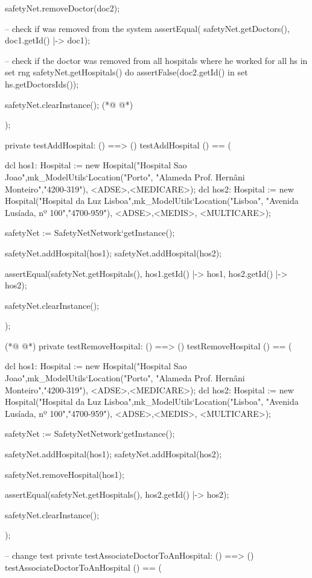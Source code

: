 \begin{vdmpp}[breaklines=true]
  safetyNet.removeDoctor(doc2);

  -- check if was removed from the system
  assertEqual( safetyNet.getDoctors(), {doc1.getId() |-> doc1});
  
  -- check if the doctor was removed from all hospitals where he worked
  for all hs in set rng safetyNet.getHospitals() do
   assertFalse(doc2.getId() in set hs.getDoctorsIds());
  
  safetyNet.clearInstance();
(*@
\label{testRemoveHospital:212}
@*)
    
);

private testAddHospital: () ==> ()
 testAddHospital () == (
  
  dcl hos1: Hospital := new Hospital("Hospital Sao Joao",mk_ModelUtils`Location("Porto", "Alameda Prof. Hernâni Monteiro","4200-319"), {<ADSE>,<MEDICARE>});
  dcl hos2: Hospital := new Hospital("Hospital da Luz Lisboa",mk_ModelUtils`Location("Lisboa", "Avenida Lusíada, nº 100","4700-959"), {<ADSE>,<MEDIS>, <MULTICARE>});
  
  safetyNet := SafetyNetNetwork`getInstance();
   
  safetyNet.addHospital(hos1);
  safetyNet.addHospital(hos2);
  
  assertEqual(safetyNet.getHospitals(), { hos1.getId() |-> hos1, hos2.getId() |-> hos2});
  
  safetyNet.clearInstance();
    
);

(*@
\label{testAssociateDoctorToAnHospital:232}
@*)
private testRemoveHospital: () ==> ()
 testRemoveHospital () == (
  
  dcl hos1: Hospital := new Hospital("Hospital Sao Joao",mk_ModelUtils`Location("Porto", "Alameda Prof. Hernâni Monteiro","4200-319"), {<ADSE>,<MEDICARE>});
  dcl hos2: Hospital := new Hospital("Hospital da Luz Lisboa",mk_ModelUtils`Location("Lisboa", "Avenida Lusíada, nº 100","4700-959"), {<ADSE>,<MEDIS>, <MULTICARE>});
  
  safetyNet := SafetyNetNetwork`getInstance();
   
  safetyNet.addHospital(hos1);
  safetyNet.addHospital(hos2);

  safetyNet.removeHospital(hos1);

  assertEqual(safetyNet.getHospitals(), { hos2.getId() |-> hos2});
  
  safetyNet.clearInstance();
    
);

-- change test
private testAssociateDoctorToAnHospital: () ==> ()
 testAssociateDoctorToAnHospital () == (
 

\end{vdmpp}
